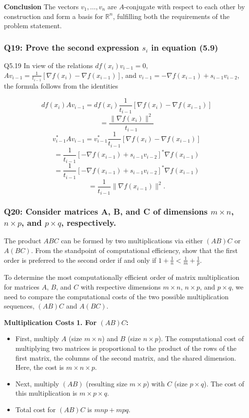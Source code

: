 \documentclass[8pt]{article}
\begin{document}
\textbf{Conclusion}
The vectors \(v_1, \ldots, v_n\) are \(A\)-conjugate with respect to each other by construction and form a basis for \(\mathbb{R}^n\), fulfilling both the requirements of the problem statement.


\subsubsection*{Q19: Prove the second expression $s_i$ in equation (5.9)}

Q5.19 In view of the relations \( df(x_i)v_{i-1} = 0 \), \( Av_{i-1} = \frac{1}{t_{i-1}}[\nabla f(x_i) - \nabla f(x_{i-1})] \), and \( v_{i-1} = -\nabla f(x_{i-1}) + s_{i-1}v_{i-2} \), the formula follows from the identities

\[
df(x_i)A v_{i-1} = df(x_i) \frac{1}{t_{i-1}} [\nabla f(x_i) - \nabla f(x_{i-1})]
\]
\[
= \frac{\| \nabla f(x_i) \|^2}{t_{i-1}}
\]
\[
v^*_{i-1}A v_{i-1} = v^*_{i-1} \frac{1}{t_{i-1}} [\nabla f(x_i) - \nabla f(x_{i-1})]
\]
\[
= \frac{1}{t_{i-1}} [-\nabla f(x_{i-1}) + s_{i-1}v_{i-2}]^* \nabla f(x_{i-1})
\]
\[
= \frac{1}{t_{i-1}} [-\nabla f(x_{i-1}) + s_{i-1}v_{i-2}]^* \nabla f(x_{i-1})
\]
\[
= \frac{1}{t_{i-1}} \| \nabla f(x_{i-1}) \|^2.
\]

\subsubsection*{Q20: Consider matrices A, B, and C of dimensions \(m \times n\), \(n \times p\), and \(p \times q\), respectively.}
The product \(ABC\) can be formed by two multiplications via either \((AB)C\) or \(A(BC)\). From the standpoint of computational efficiency, show that the first order is preferred to the second order if and only if \(1 + \frac{1}{n} < \frac{1}{m} + \frac{1}{p}\).

To determine the most computationally efficient order of matrix multiplication for matrices \( A \), \( B \), and \( C \) with respective dimensions \( m \times n \), \( n \times p \), and \( p \times q \), we need to compare the computational costs of the two possible multiplication sequences, \((AB)C\) and \(A(BC)\).

\textbf{Multiplication Costs}
\textbf{1. For \((AB)C\):}
   \begin{itemize}
       \item First, multiply \( A \) (size \( m \times n \)) and \( B \) (size \( n \times p \)). The computational cost of multiplying two matrices is proportional to the product of the rows of the first matrix, the columns of the second matrix, and the shared dimension. Here, the cost is \( m \times n \times p \).
       \item Next, multiply \( (AB) \) (resulting size \( m \times p \)) with \( C \) (size \( p \times q \)). The cost of this multiplication is \( m \times p \times q \).
       \item Total cost for \((AB)C\) is \( mnp + mpq \).
   \end{itemize}
\end{document}
